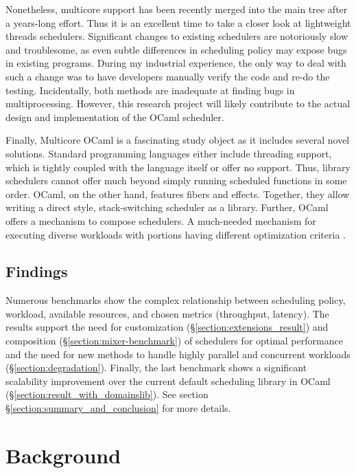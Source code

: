 \documentclass[12pt,a4paper,twoside]{report}
\begin{document}
Nonetheless, multicore support has been recently merged into the main tree after a years-long effort. Thus it is an excellent time to take a closer look at lightweight threads schedulers. Significant changes to existing schedulers are notoriously slow and troublesome, as even subtle differences in scheduling policy may expose bugs in existing programs. During my industrial experience, the only way to deal with such a change was to have developers manually verify the code and re-do the testing. Incidentally, both methods are inadequate at finding bugs in multiprocessing. However, this research project will likely contribute to the actual design and implementation of the OCaml scheduler. 

Finally, Multicore OCaml is a fascinating study object as it includes several novel solutions. Standard programming languages either include threading support, which is tightly coupled with the language itself or offer no support. Thus, library schedulers cannot offer much beyond simply running scheduled functions in some order. OCaml, on the other hand, features fibers and effects. Together, they allow writing a direct style, stack-switching scheduler as a library. Further, OCaml offers a mechanism to compose schedulers. A much-needed mechanism for executing diverse workloads with portions having different optimization criteria \cite{Tennenhouse89layeredmultiplexing}.


\section{Findings}
\label{section:findings}

Numerous benchmarks show the complex relationship between scheduling policy, workload, available resources, and chosen metrics (throughput, latency). The results support the need for customization (\S\ref{section:extensions_result}) and composition (\S\ref{section:mixer-benchmark}) of schedulers for optimal performance and the need for new methods to handle highly parallel and concurrent workloads (\S\ref{section:degradation}). Finally, the last benchmark shows a significant scalability improvement over the current default scheduling library in OCaml (\S\ref{section:result_with_domainslib}). See section \S\ref{section:summary_and_conclusion} for more details.


\chapter{Background}
\end{document}
